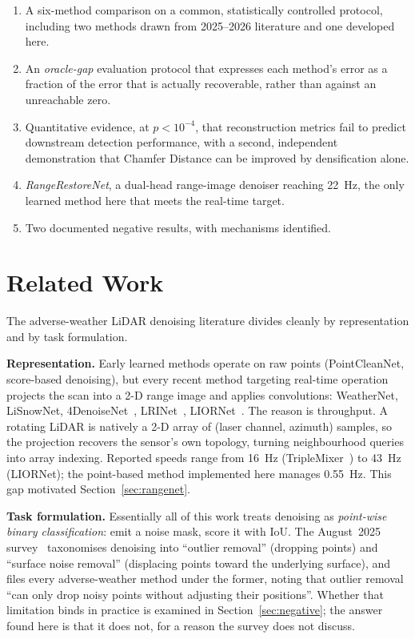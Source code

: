 \documentclass[11pt,a4paper]{article}
\begin{document}
\begin{enumerate}
\item A six-method comparison on a common, statistically controlled protocol,
including two methods drawn from 2025--2026 literature and one developed here.
\item An \emph{oracle-gap} evaluation protocol that expresses each method's
error as a fraction of the error that is actually recoverable, rather than
against an unreachable zero.
\item Quantitative evidence, at $p<10^{-4}$, that reconstruction metrics fail
to predict downstream detection performance, with a second, independent
demonstration that Chamfer Distance can be improved by densification alone.
\item \emph{RangeRestoreNet}, a dual-head range-image denoiser reaching
22~Hz, the only learned method here that meets the real-time target.
\item Two documented negative results, with mechanisms identified.
\end{enumerate}

\section{Related Work}

The adverse-weather LiDAR denoising literature divides cleanly by
representation and by task formulation.

\textbf{Representation.} Early learned methods operate on raw points
(PointCleanNet, score-based denoising), but every recent method targeting
real-time operation projects the scan into a 2-D range image and applies
convolutions: WeatherNet, LiSnowNet, 4DenoiseNet~\cite{4denoise},
LRINet~\cite{lrinet}, LIORNet~\cite{liornet}. The reason is throughput. A
rotating LiDAR is natively a 2-D array of (laser channel, azimuth) samples,
so the projection recovers the sensor's own topology, turning neighbourhood
queries into array indexing. Reported speeds range from 16~Hz
(TripleMixer~\cite{triplemixer}) to 43~Hz (LIORNet); the point-based method
implemented here manages 0.55~Hz. This gap motivated
Section~\ref{sec:rangenet}.

\textbf{Task formulation.} Essentially all of this work treats denoising as
\emph{point-wise binary classification}: emit a noise mask, score it with
IoU. The August~2025 survey~\cite{survey} taxonomises denoising into
``outlier removal'' (dropping points) and ``surface noise removal''
(displacing points toward the underlying surface), and files every
adverse-weather method under the former, noting that outlier removal ``can
only drop noisy points without adjusting their positions''. Whether that
limitation binds in practice is examined in Section~\ref{sec:negative}; the
answer found here is that it does not, for a reason the survey does not
discuss.
\end{document}
